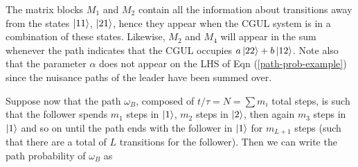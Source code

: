The matrix blocks $M_1$ and $M_2$ contain all the information about transitions away from the states $\ket{11}$, $\ket{21}$, hence they appear when the CGUL system is in a combination of these states. Likewise, $M_2$ and $M_4$ will appear in the sum whenever the path indicates that the CGUL occupies $a\ket{22} + b\ket{12}$. Note also that the parameter $\alpha$ does not appear on the LHS of Eqn (\ref{path-prob-example}) since the nuisance paths of the leader have been summed over. 

Suppose now that the path $\omega_B$, composed of $t/\tau = N = \sum m_i$ total steps, is such that the follower spends $m_1$ steps in $\ket{1}$, $m_2$ steps in $\ket{2}$, then again  $m_3$ steps in $\ket{1}$ and so on until the path ends with the follower in $\ket{1}$ for $m_{L+1}$ steps (such that there are a total of $L$ transitions for the follower). Then we can write the path probability of $\omega_B$ as

